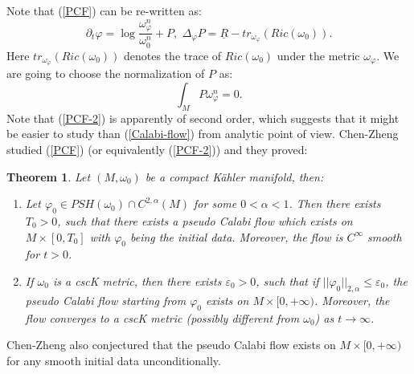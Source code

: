 \documentclass[11pt]{amsart}
\newtheorem{thm}{Theorem}[section]
\numberwithin{equation}{section}
\newcommand \eps{\varepsilon}
\begin{document}
Note that (\ref{PCF}) can be re-written as:
\begin{equation}\label{PCF-2}
\partial_t\varphi=\log\frac{\omega_{\varphi}^n}{\omega_0^n}+P,\,\,\Delta_{\varphi}P=\underline{R}-tr_{\omega_{\varphi}}(Ric(\omega_0)).
\end{equation}
Here $tr_{\omega_{\varphi}}(Ric(\omega_0))$ denotes the trace of $Ric(\omega_0)$ under the metric $\omega_{\varphi}$.  We are going to choose the normalization of $P$ as:
\begin{equation*}
\int_MP\omega_{\varphi}^n=0.
\end{equation*}
Note that (\ref{PCF-2}) is apparently of second order,  which suggests that it might be easier to study than (\ref{Calabi-flow}) from analytic point of view. 
Chen-Zheng \cite{Chen-Zheng} studied (\ref{PCF}) (or equivalently (\ref{PCF-2})) and they proved:
\begin{thm}\label{t1.1}
Let $(M,\omega_0)$ be a compact K\"ahler manifold,  then:
\begin{enumerate}
\item Let $\varphi_0\in PSH(\omega_0)\cap C^{2,\alpha}(M)$ for some $0<\alpha<1$.  Then there exists $T_0>0$,  such that there exists a pseudo Calabi flow which exists on $M\times [0,T_0]$ with $\varphi_0$ being the initial data.  Moreover,  the flow is $C^{\infty}$ smooth for $t>0$.
\item If $\omega_0$ is a cscK metric,  then there exists $\eps_0>0$,  such that if $||\varphi_0||_{2,\alpha}\le \eps_0$,  the pseudo Calabi flow starting from $\varphi_0$ exists on $M\times [0,+\infty)$.  Moreover,  the flow converges to a cscK metric (possibly different from $\omega_0$) as $t\rightarrow \infty$.
\end{enumerate}
\end{thm}
Chen-Zheng \cite{Chen-Zheng} also conjectured that the pseudo Calabi flow exists on $M\times [0,+\infty)$ for any smooth initial data unconditionally.  \\
\end{document}
